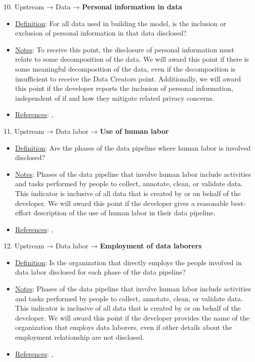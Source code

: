 10. Upstream → Data → \textbf{Personal information in data}
\vspace{-\parskip}
\begin{itemize}
	\item
	\underline{Definition}: For all data used in building the model, is the inclusion or exclusion of personal information in that data disclosed?
	\item
	\underline{Notes}: To receive this point, the disclosure of personal information must relate to some decomposition of the data. We will award this point if there is some meaningful decomposition of the data, even if the decomposition is insufficient to receive the Data Creators point. Additionally, we will award this point if the developer reports the inclusion of personal information, independent of if and how they mitigate related privacy concerns.
	\item
	\underline{References}: \citet{west2019data}, \citet{brown2022does}
\end{itemize} \vspace{\baselineskip}


11. Upstream → Data labor → \textbf{Use of human labor}
\vspace{-\parskip}
\begin{itemize}
	\item
	\underline{Definition}: Are the phases of the data pipeline where human labor is involved disclosed?
	\item
	\underline{Notes}: Phases of the data pipeline that involve human labor include activities and tasks performed by people to collect, annotate, clean, or validate data. This indicator is inclusive of all data that is created by or on behalf of the developer. We will award this point if the developer gives a reasonable best-effort description of the use of human labor in their data pipeline.
	\item
	\underline{References}: \citet{kittur2013future}, \citet{dzieza2023ai}
\end{itemize} \vspace{\baselineskip}


12. Upstream → Data labor → \textbf{Employment of data laborers}
\vspace{-\parskip}
\begin{itemize}
	\item
	\underline{Definition}: Is the organization that directly employs the people involved in data labor disclosed for each phase of the data pipeline?
	\item
	\underline{Notes}: Phases of the data pipeline that involve human labor include activities and tasks performed by people to collect, annotate, clean, or validate data. This indicator is inclusive of all data that is created by or on behalf of the developer. We will award this point if the developer provides the name of the organization that employs data laborers, even if other details about the employment relationship are not disclosed.
	\item
	\underline{References}: \citet{kittur2013future}, \citet{dzieza2023ai}
\end{itemize} \vspace{\baselineskip}


